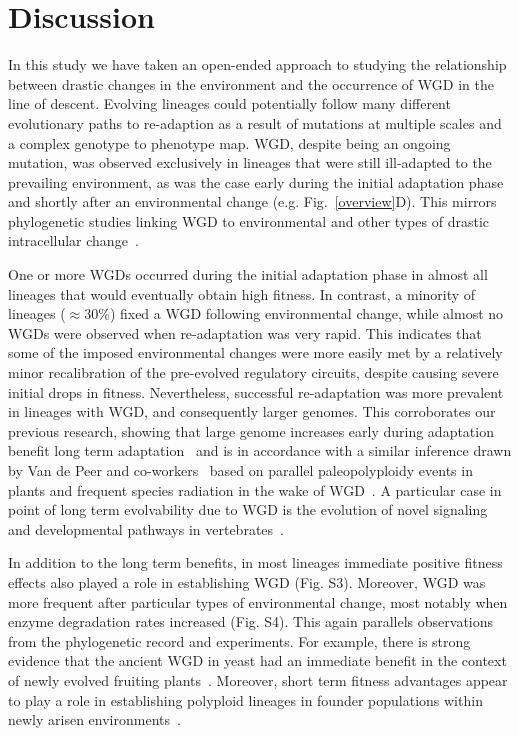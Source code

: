 \section{Discussion}
In this study we have taken an open-ended approach to studying the relationship between drastic changes in the environment and the occurrence of WGD in the line of descent. Evolving lineages could potentially follow many different evolutionary paths to re-adaption as a result of mutations at multiple scales and a complex genotype to phenotype map. WGD, despite being an ongoing mutation, was observed exclusively in lineages that were still ill-adapted to the prevailing environment, as was the case early during the initial adaptation phase and shortly after an environmental change (e.g. Fig.~\ref{overview}D). This mirrors phylogenetic studies linking WGD to environmental and other types of drastic intracellular change~\cite{barrier_interspecific_1999,brochmann_polyploidy_2004,fawcett_plants_2009, van_hoek_metabolic_2009, makarova_ancestral_2005}. 

One or more WGDs occurred during the initial adaptation phase in almost all lineages that would eventually obtain high fitness. In contrast, a minority of lineages ($\approx30\%$) fixed a WGD following environmental change, while almost no WGDs were observed when re-adaptation was very rapid. This indicates that some of the imposed environmental changes were more easily met by a relatively minor recalibration of the pre-evolved regulatory circuits, despite causing severe initial drops in fitness. 
Nevertheless, successful re-adaptation was more prevalent in lineages with WGD, and consequently larger genomes. This corroborates our previous research, showing that large genome increases early during adaptation benefit long term adaptation~\cite{cuypers_virtual_2012} and is in accordance with a similar inference drawn by Van de Peer and co-workers~\cite{van_de_peer_evolutionary_2009,fawcett_plants_2009} based on parallel paleopolyploidy events in plants and frequent species radiation in the wake of WGD~\cite{de_bodt_genome_2005,blomme_gain_2006,soltis_polyploidy_2009,jiao_genome_2012}. A particular case in point of long term evolvability due to WGD is the evolution of novel signaling and developmental pathways in vertebrates~\cite{gillis_whole_2009,huminiecki_2r_2010,huminiecki_polyploidy_2012}.

In addition to the long term benefits, in most lineages immediate positive fitness effects also played a role in establishing WGD (Fig. S3). Moreover, WGD was more frequent after particular types of environmental change, most notably when enzyme degradation rates increased (Fig. S4). This again parallels observations from the phylogenetic record and experiments. For example, there is strong evidence that the ancient WGD in yeast had an immediate benefit in the context of newly evolved fruiting plants~\cite{conant_increased_2007,van_hoek_metabolic_2009}. Moreover, short term fitness advantages appear to play a role in establishing polyploid lineages in founder populations within newly arisen environments~\cite{barrier_interspecific_1999,brochmann_polyploidy_2004,otto_evolutionary_2007,beest_more_2012}. 

